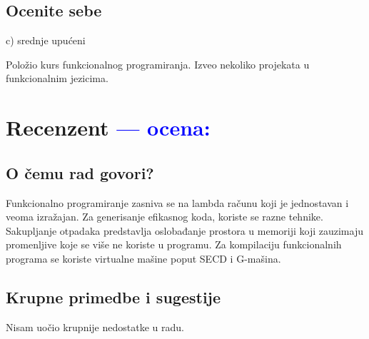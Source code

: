 \documentclass[a4paper]{report}
\newcommand{\odgovor}[1]{\textcolor{blue}{#1}}
\begin{document}
\section{Ocenite sebe}
c) srednje upućeni


Položio kurs funkcionalnog programiranja. Izveo nekoliko projekata u funkcionalnim jezicima.

\chapter{Recenzent \odgovor{---  ocena:} }


\section{O čemu rad govori?}
Funkcionalno programiranje zasniva se na lambda računu koji je jednostavan i veoma izražajan.  Za generisanje efikasnog koda, koriste se razne tehnike. Sakupljanje otpadaka predstavlja oslobađanje prostora u memoriji koji zauzimaju promenljive koje se više ne koriste u programu. Za kompilaciju funkcionalnih programa se koriste virtualne mašine poput SECD i G-mašina.

\section{Krupne primedbe i sugestije}
Nisam uočio krupnije nedostatke u radu.
\end{document}
